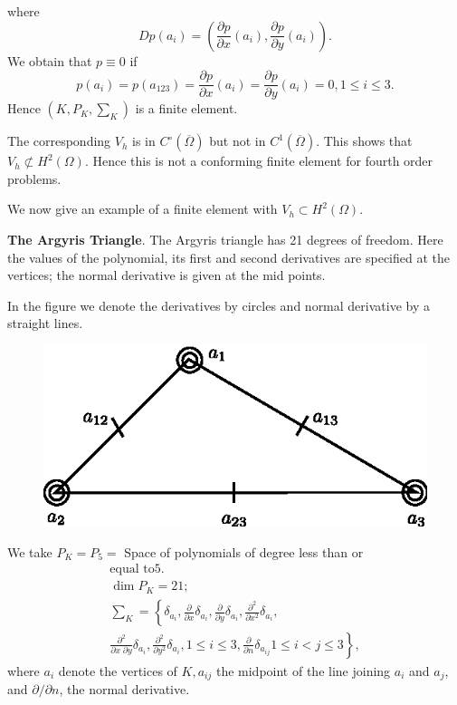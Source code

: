 \begin{exam}
\noindent where
$$
Dp(a_i)=\left( \frac{\partial p}{\partial x}(a_i), \frac{\partial p}
{\partial y}(a_i) \right ).
$$
We obtain that $p\equiv 0$ if 
$$
p(a_i)=p(a_{123})=\frac{\partial p}{\partial x}(a_i)= \frac{\partial
p}{\partial y}(a_i)=0, 1\leq i\leq 3.
$$
Hence $(K, P_K, \sum_K)$ is a finite element.

The corresponding $V_h$ is in $C^\circ(\overline{\Omega})$ but not in
$C^1(\overline{\Omega})$. This shows that $V_h\nsubset
H^2(\Omega)$. Hence this is not a conforming finite element for fourth
order problems.

We now give an example of a finite element with $V_h\subset H^2(\Omega)$.
\end{exam}

\begin{exam}\label{chap3:exm5}
{\bf The Argyris Triangle}. The Argyris triangle has 21 degrees of
freedom. Here the values of the polynomial, its first and second
derivatives are specified at the vertices; the normal derivative is
given at the mid points.

In the figure we denote the derivatives by circles and normal
derivative by a straight lines. 
\begin{figure}[H]
\centering
\includegraphics{figure/fig3.9.eps}
\caption{}\label{fig3.9}
\end{figure}\pageoriginale

We take $P_K=P_5=$ Space of polynomials of degree less than or 
\begin{multline*}
\text{equal to} 5.\\
\dim P_K=21;\\
\sum_K=\left\{\delta_{a_i}, \frac{\partial}{\partial x}\delta_{a_i},
\frac{\partial}{\partial y}\delta_{a_i}, \frac{\partial^2} {\partial
x^2}\delta_{a_i},\right.\\
\left.\frac{\partial^2}{\partial x\;\partial y}\delta_{a_i},
\frac{\partial^2}{\partial y^2}\delta_{a_i}, 1\leq i\leq 3,
\frac{\partial}{\partial n}\delta_{a_{ij}}1\leq i<j\leq 3\right\},
\end{multline*}
where $a_i$ denote the vertices of $K, a_{ij}$ the midpoint of the
line joining $a_i$ and $a_j$, and $\partial/\partial n$, the normal
derivative.


\end{exam}
